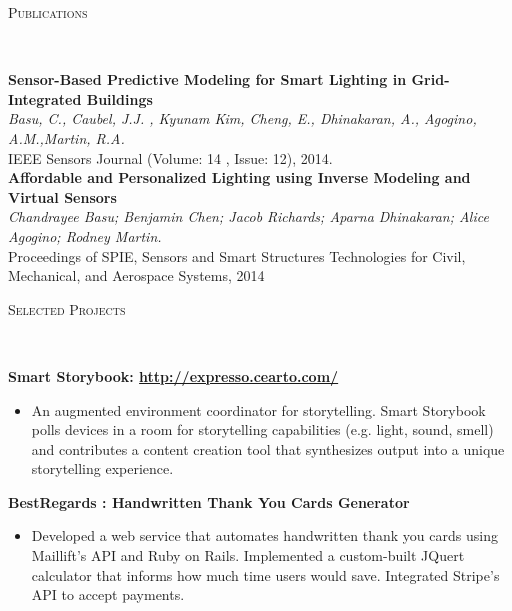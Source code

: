 \documentclass[9pt]{extarticle}
\newenvironment{changemargin}[2]{%
  \begin{list}{}{%
    \setlength{\topsep}{0pt}%
    \setlength{\leftmargin}{#1}%
    \setlength{\rightmargin}{#2}%
    \setlength{\listparindent}{\parindent}%
    \setlength{\itemindent}{\parindent}%
    \setlength{\parsep}{\parskip}%
  }%
  \item[]}{\end{list}
}
\newcommand{\lineover}{
	\begin{changemargin}{-0.05in}{-0.05in}
		\vspace*{-8pt}
		\hrulefill \\
		\vspace*{-2pt}
	\end{changemargin}
}
\newcommand{\header}[1]{
    \vspace{5pt}
	\begin{changemargin}{-0.5in}{-0.5in}
		\scshape{#1}\\
  	\lineover
	\end{changemargin}
	\vspace{5pt}
}
\newenvironment{body} {
	\vspace*{-9pt}
	\begin{changemargin}{-0.5in}{-0.5in}
  }	
	{\end{changemargin}
}
\begin{document}
\vspace*{-2pt}
\header{Publications}
\begin{body}

\textbf {Sensor-Based Predictive Modeling for Smart Lighting in Grid-Integrated Buildings}\\ 
\emph{Basu, C., Caubel, J.J. , Kyunam Kim, Cheng, E., Dhinakaran, A., Agogino, A.M.,Martin, R.A.} \\
{IEEE Sensors Journal (Volume: 14 , Issue: 12), 2014. }\\

$ $\\

\textbf {Affordable and Personalized Lighting using Inverse Modeling and Virtual Sensors}\\
\emph{Chandrayee Basu; Benjamin Chen; Jacob Richards; Aparna Dhinakaran; Alice Agogino; Rodney Martin.} \\
{Proceedings of SPIE, Sensors and Smart Structures Technologies for Civil, Mechanical, and Aerospace Systems, 2014}
\end{body}

\vspace*{-2pt}
\header{Selected Projects}
\begin{body}


	\textbf {Smart Storybook: {\url{http://expresso.cearto.com/}}}
    \vspace*{-3pt}
    \begin{itemize}
    \item[] An augmented environment coordinator for storytelling. Smart Storybook polls devices in a room for storytelling capabilities (e.g. light, sound, smell) and contributes a content creation tool that synthesizes output into a unique storytelling experience.
    \end{itemize}

	\textbf {BestRegards : Handwritten Thank You Cards Generator}
    \vspace*{-3pt}
    \begin{itemize}
    \item[] Developed a web service that automates handwritten thank you cards using Maillift's API and Ruby on Rails. Implemented a custom-built JQuert calculator that informs how much time users would save. Integrated Stripe's API to accept payments.
    \end{itemize}
    \end{body}
\end{document}
